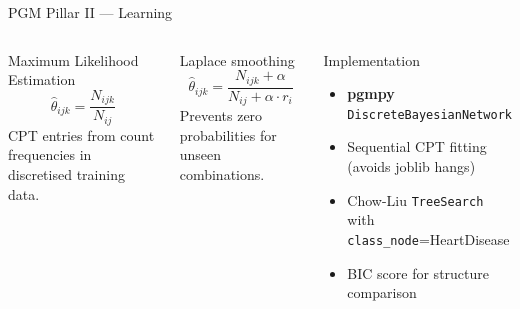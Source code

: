 \documentclass[aspectratio=169,11pt]{beamer}
\begin{document}
\begin{frame}{PGM Pillar II --- Learning}
  \begin{columns}[T]
    \begin{block}{Maximum Likelihood Estimation}
      \[
        \hat{\theta}_{ijk} = \frac{N_{ijk}}{N_{ij}}
      \]
      CPT entries from count frequencies in discretised training data.
    \end{block}
    \begin{block}{Laplace smoothing}
      \[
        \hat{\theta}_{ijk} = \frac{N_{ijk} + \alpha}{N_{ij} + \alpha \cdot r_i}
      \]
      Prevents zero probabilities for unseen combinations.
    \end{block}
    \begin{block}{Implementation}
      \begin{itemize}
        \item \textbf{pgmpy} \texttt{DiscreteBayesianNetwork}
        \item Sequential CPT fitting (avoids joblib hangs)
        \item Chow-Liu \texttt{TreeSearch} with \texttt{class\_node}=HeartDisease
        \item BIC score for structure comparison
      \end{itemize}
    \end{block}
  \end{columns}
\end{frame}
\end{document}

